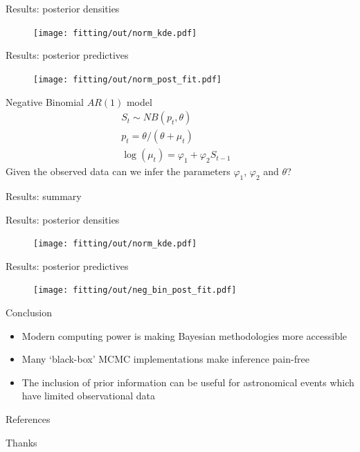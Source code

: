 \documentclass[aspectratio=169]{beamer}
\begin{document}
\begin{frame}{Results: posterior densities}
    \begin{figure}
      \centering
      \texttt{[image: fitting/out/norm\_kde.pdf]}
    \end{figure}
\end{frame}

\begin{frame}{Results: posterior predictives}
  \vspace{-0.3cm}
  \begin{figure}
    \centering
    \texttt{[image: fitting/out/norm\_post\_fit.pdf]}
  \end{figure}
\end{frame}

\begin{frame}{Negative Binomial $AR(1)$ model}
  \begin{align*}
    S_{t} \sim NB(p_t, \theta)& \\
    p_t = \theta / (\theta + \mu_t)& \\
    \log(\mu_t) = \varphi_1 + \varphi_2S_{t-1}&
  \end{align*}
  Given the observed data can we infer the parameters $\varphi_1$,
  $\varphi_2$ and $\theta$?
\end{frame}

\begin{frame}{Results: summary}
  \begin{table}
    \centering
      
      \caption{Summary of posterior samples after running Stan for $10\,000$ iterations (30 seconds).}
  \end{table}
\end{frame}

\begin{frame}{Results: posterior densities}
  \begin{figure}
    \centering
    \texttt{[image: fitting/out/norm\_kde.pdf]}
  \end{figure}
\end{frame}

\begin{frame}{Results: posterior predictives}
  \vspace{-0.3cm}
  \begin{figure}
    \centering
    \texttt{[image: fitting/out/neg\_bin\_post\_fit.pdf]}
  \end{figure}
\end{frame}

\begin{frame}{Conclusion}
  \begin{itemize}
    \item Modern computing power is making Bayesian methodologies more accessible
    \item Many `black-box' MCMC implementations make inference pain-free
    \item The inclusion of prior information can be useful for astronomical
      events which have limited observational data
  \end{itemize}
\end{frame}

\begin{frame}{References}
  \nocite{hilbe2017bayesian}
  
\end{frame}

\begin{frame}[standout]
  Thanks
\end{frame}
\end{document}
